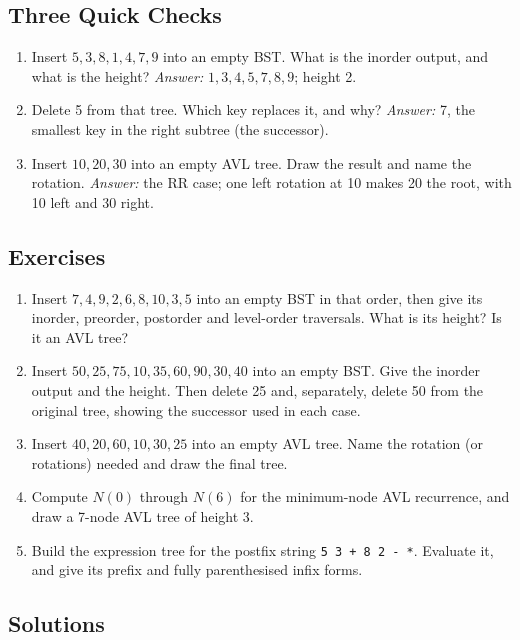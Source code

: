 \documentclass[11pt]{article}
\theoremstyle{definition}
\begin{document}
\subsection*{Three Quick Checks}

\begin{enumerate}
  \item Insert $5,3,8,1,4,7,9$ into an empty BST. What is the inorder output,
    and what is the height? \emph{Answer:} $1,3,4,5,7,8,9$; height 2.
  \item Delete 5 from that tree. Which key replaces it, and why?
    \emph{Answer:} 7, the smallest key in the right subtree (the successor).
  \item Insert $10,20,30$ into an empty AVL tree. Draw the result and name
    the rotation. \emph{Answer:} the RR case; one left rotation at 10 makes
    20 the root, with 10 left and 30 right.
\end{enumerate}

\subsection*{Exercises}

\begin{enumerate}
  \item Insert $7,4,9,2,6,8,10,3,5$ into an empty BST in that order, then
    give its inorder, preorder, postorder and level-order traversals. What is
    its height? Is it an AVL tree?
  \item Insert $50,25,75,10,35,60,90,30,40$ into an empty BST. Give the
    inorder output and the height. Then delete 25 and, separately, delete 50
    from the original tree, showing the successor used in each case.
  \item Insert $40,20,60,10,30,25$ into an empty AVL tree. Name the rotation
    (or rotations) needed and draw the final tree.
  \item Compute $N(0)$ through $N(6)$ for the minimum-node AVL recurrence,
    and draw a 7-node AVL tree of height 3.
  \item Build the expression tree for the postfix string
    \texttt{5 3 + 8 2 - *}. Evaluate it, and give its prefix and fully
    parenthesised infix forms.
\end{enumerate}

\subsection*{Solutions}
\end{document}

